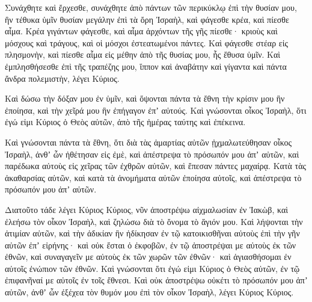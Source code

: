 {\par }{\PP Συνάχθητε καὶ ἔρχεσθε, συνάχθητε ἀπὸ πάντων τῶν περικύκλῳ ἐπὶ τὴν θυσίαν μου, ἣν τέθυκα ὑμῖν θυσίαν μεγάλην ἐπὶ τὰ ὄρη Ἰσραὴλ, καὶ φάγεσθε κρέα, καὶ πίεσθε αἷμα.
Κρέα γιγάντων φάγεσθε, καὶ αἷμα ἀρχόντων τῆς γῆς πίεσθε· κριοὺς καὶ μόσχους καὶ τράγους, καὶ οἱ μόσχοι ἐστεατωμένοι πάντες.
Καὶ φάγεσθε στέαρ εἰς πλησμονὴν, καὶ πίεσθε αἷμα εἰς μέθην ἀπὸ τῆς θυσίας μου, ἧς ἔθυσα ὑμῖν.
Καὶ ἐμπλησθήσεσθε ἐπὶ τῆς τραπέζης μου, ἵππον καὶ ἀναβάτην καὶ γίγαντα καὶ πάντα ἄνδρα πολεμιστὴν, λέγει Κύριος.
\par }{\PP {}Καὶ δώσω τὴν δόξαν μου ἐν ὑμῖν, καὶ ὄψονται πάντα τὰ ἔθνη τὴν κρίσιν μου ἣν ἐποίησα, καὶ τὴν χεῖρά μου ἣν ἐπήγαγον ἐπʼ αὐτούς.
Καὶ γνώσονται οἶκος Ἰσραὴλ, ὅτι ἐγώ εἰμι Κύριος ὁ Θεὸς αὐτῶν, ἀπὸ τῆς ἡμέρας ταύτης καὶ ἐπέκεινα.
\par }{\PP {}Καὶ γνώσονται πάντα τὰ ἔθνη, ὅτι διὰ τὰς ἁμαρτίας αὐτῶν ᾐχμαλωτεύθησαν οἶκος Ἰσραὴλ, ἀνθʼ ὧν ἠθέτησαν εἰς ἐμὲ, καὶ ἀπέστρεψα τὸ πρόσωπόν μου ἀπʼ αὐτῶν, καὶ παρέδωκα αὐτοὺς εἰς χεῖρας τῶν ἐχθρῶν αὐτῶν, καὶ ἔπεσαν πάντες μαχαίρᾳ.
Κατὰ τὰς ἀκαθαρσίας αὐτῶν, καὶ κατὰ τὰ ἀνομήματα αὐτῶν ἐποίησα αὐτοῖς, καὶ ἀπέστρεψα τὸ πρόσωπόν μου ἀπʼ αὐτῶν.
\par }{\PP {}Διατοῦτο τάδε λέγει Κύριος Κύριος, νῦν ἀποστρέψω αἰχμαλωσίαν ἐν Ἰακὼβ, καὶ ἐλεήσω τὸν οἶκον Ἰσραὴλ, καὶ ζηλώσω διὰ τὸ ὄνομα τὸ ἅγιόν μου.
Καὶ λήψονται τὴν ἀτιμίαν αὐτῶν, καὶ τὴν ἀδικίαν ἣν ἠδίκησαν ἐν τῷ κατοικισθῆναι αὐτοὺς ἐπὶ τὴν γῆν αὐτῶν ἐπʼ εἰρήνης· καὶ οὐκ ἔσται ὁ ἐκφοβῶν,
ἐν τῷ ἀποστρέψαι με αὐτοὺς ἐκ τῶν ἐθνῶν, καὶ συναγαγεῖν με αὐτοὺς ἐκ τῶν χωρῶν τῶν ἐθνῶν· καὶ ἁγιασθήσομαι ἐν αὐτοῖς ἐνώπιον τῶν ἐθνῶν.
Καὶ γνώσονται ὅτι ἐγώ εἰμι Κύριος ὁ Θεὸς αὐτῶν, ἐν τῷ ἐπιφανῆναί με αὐτοῖς ἐν τοῖς ἔθνεσι.
Καὶ οὐκ ἀποστρέψω οὐκέτι τὸ πρόσωπόν μου ἀπʼ αὐτῶν, ἀνθʼ ὧν ἐξέχεα τὸν θυμόν μου ἐπὶ τὸν οἶκον Ἰσραὴλ, λέγει Κύριος Κύριος.

}
